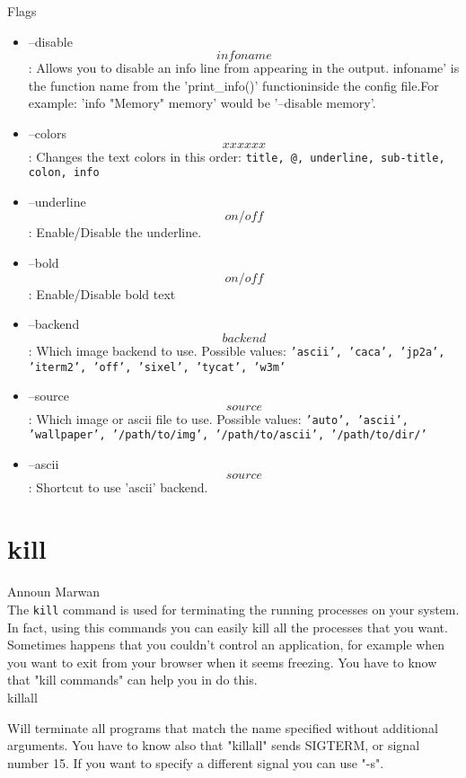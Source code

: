 \documentclass[hidelinks,12pt,a4paper,numbers=enddot]{scrartcl}
\begin{document}
Flags
\begin{itemize}
    \item --disable \[infoname\]: Allows you to disable an info line from appearing
        in the output. infoname' is the function name from the 'print\_info()'
        functioninside  the  config  file.For example: 'info "Memory" memory'
        would be '--disable memory'.
    
    \item --colors \[x x x x x x\]: Changes the text colors in this order:
        \texttt{title, @, underline, sub-title, colon, info}
    
    \item --underline \[on/off\]: Enable/Disable the underline.
    \item --bold \[on/off\]: Enable/Disable bold text
    \item --backend \[backend\]: Which image backend to use. Possible values:
        \texttt{'ascii', 'caca', 'jp2a', 'iterm2', 'off', 'sixel', 'tycat', 'w3m'}
    
    \item --source \[source\]: Which image or ascii file  to  use. Possible values:
        \texttt{'auto', 'ascii',    'wallpaper',    '/path/to/img', '/path/to/ascii',
            '/path/to/dir/'}
    
    \item --ascii \[source\]: Shortcut to use 'ascii' backend.
\end{itemize}

\section{kill}


\large Announ Marwan \normalsize\\


The \texttt{kill} command is used for terminating the
running processes on your system.\\

In fact, using this commands you can easily kill all the processes that you want.
Sometimes happens that you couldn't control an application, for example when
you want to exit from your browser when it seems freezing.
You have to know that "kill commands" can help you in do this.\\

killall

Will terminate all programs that match the name specified without
additional arguments.
You have to know also that "killall" sends SIGTERM, or signal number 15.
If you want to specify a different signal you can use "-s".
\end{document}
